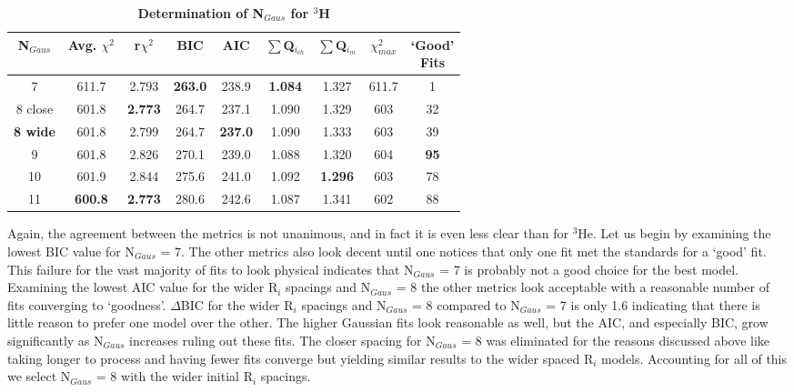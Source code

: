 \vspace{6mm}
\begin{table}[!h]
\centering
\begin{tabular}{|c c c c c c c c c|}
\hline
\textbf{N$_{Gaus}$} & \textbf{Avg. $\chi^2$} & \textbf{r$\chi^2$} & \textbf{BIC} & \textbf{AIC} & \textbf{$\sum$Q$_{i_{ch}}$} & \textbf{$\sum$Q$_{i_{m}}$} & \textbf{$\chi^2_{max}$} & \makecell{\textbf{`Good'}\\ \textbf{Fits}} \\
\hline
7 & 611.7 & 2.793 & \textbf{263.0} & 238.9 & \textbf{1.084} & 1.327 & 611.7 & 1\\
8 close & 601.8 & \textbf{2.773} & 264.7 & 237.1 & 1.090 & 1.329 & 603 & 32\\
\textbf{8 wide} & 601.8 & 2.799 & 264.7 & \textbf{237.0} & 1.090 & 1.333 & 603 & 39\\
9 & 601.8 & 2.826 & 270.1 & 239.0 & 1.088 & 1.320 & 604 & \textbf{95}\\
10 & 601.9 & 2.844 & 275.6 & 241.0 & 1.092 & \textbf{1.296} & 603 & 78\\
11 & \textbf{600.8} & \textbf{2.773} & 280.6 & 242.6 & 1.087 & 1.341 & 602 & 88\\
\hline
\end{tabular}
\caption{\bf{Determination of N$_{Gaus}$ for $^3$H}}
\label{tab:3h_ngaus}
\end{table}

Again, the agreement between the metrics is not unanimous, and in fact it is even less clear than for $^3$He. Let us begin by examining the lowest BIC value for N$_{Gaus}$ = 7. The other metrics also look decent until one notices that only one fit met the standards for a `good' fit. This failure for the vast majority of fits to look physical indicates that N$_{Gaus}$ = 7 is probably not a good choice for the best model. Examining the lowest AIC value for the wider R$_i$ spacings and N$_{Gaus}$ = 8 the other metrics look acceptable with a reasonable number of fits converging to `goodness'. $\Delta$BIC for the wider R$_i$ spacings and N$_{Gaus}$ = 8 compared to N$_{Gaus}$ = 7 is only 1.6 indicating that there is little reason to prefer one model over the other. The higher Gaussian fits look reasonable as well, but the AIC, and especially BIC, grow significantly as N$_{Gaus}$ increases ruling out these fits. The closer spacing for N$_{Gaus}$ = 8 was eliminated for the reasons discussed above like taking longer to process and having fewer fits converge but yielding similar results to the wider spaced R$_i$ models. Accounting for all of this we select N$_{Gaus}$ = 8 with the wider initial R$_i$ spacings.

